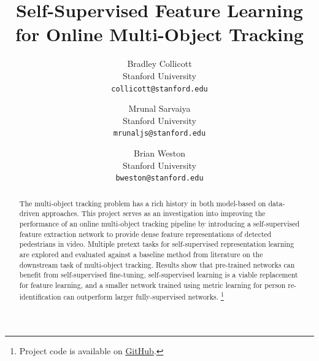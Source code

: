 \documentclass[10pt,twocolumn,letterpaper]{article}
\begin{document}
\title{Self-Supervised Feature Learning for Online Multi-Object Tracking}

\author{Bradley Collicott\\
Stanford University\\
{\tt\small collicott@stanford.edu}
\and
Mrunal Sarvaiya\\
Stanford University\\
{\tt\small mrunaljs@stanford.edu}
\and
Brian Weston\\
Stanford University\\
{\tt\small bweston@stanford.edu}
}

\maketitle

\thispagestyle{plain}
\pagestyle{plain}


\begin{abstract}
The multi-object tracking problem has a rich history in both model-based on data-driven approaches. This project serves as an investigation into improving the performance of an online multi-object tracking pipeline by introducing a self-supervised feature extraction network to provide dense feature representations of detected pedestrians in video. Multiple pretext tasks for self-supervised representation learning are explored and evaluated against a baseline method from literature on the downstream task of multi-object tracking. Results show that pre-trained networks can benefit from self-supervised fine-tuning, self-supervised learning is a viable replacement for feature learning, and a smaller network trained using metric learning for person re-identification can outperform larger fully-supervised networks. \footnote{Project code is available on \href{https://github.com/bcollico/cs231n_final_project}{GitHub}.}
\end{abstract}
\end{document}
